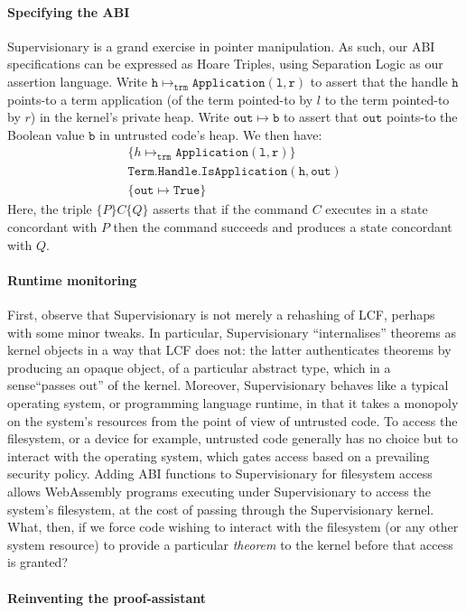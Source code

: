 \documentclass[sigplan, review]{acmart}
\begin{document}
\paragraph{Specifying the ABI}
Supervisionary is a grand exercise in pointer manipulation.
As such, our ABI specifications can be expressed as Hoare Triples, using Separation Logic as our assertion language.
Write $\mathtt{h} \mapsto_{\mathtt{trm}} \mathtt{Application(l, r)}$ to assert that the handle $\mathtt{h}$ points-to a term application (of the term pointed-to by $l$ to the term pointed-to by $r$) in the kernel's private heap.
Write $\mathtt{out} \mapsto \mathtt{b}$ to assert that $\mathtt{out}$ points-to the Boolean value $\mathtt{b}$ in untrusted code's heap.
We then have:
\begin{gather*}
\{ h \mapsto_{\mathtt{trm}} \mathtt{Application(l, r)} \} \\
\mathtt{Term.Handle.IsApplication(h, out)} \\
\{ \mathtt{out} \mapsto \mathtt{True} \}
\end{gather*}
Here, the triple $\{ P \} C \{ Q \}$ asserts that if the command $C$ executes in a state concordant with $P$ then the command succeeds and produces a state concordant with $Q$.

\paragraph{Runtime monitoring}

First, observe that Supervisionary is not merely a rehashing of LCF, perhaps with some minor tweaks.
In particular, Supervisionary ``internalises'' theorems as kernel objects in a way that LCF does not: the latter authenticates theorems by producing an opaque object, of a particular abstract type, which in a sense``passes out'' of the kernel.
Moreover, Supervisionary behaves like a typical operating system, or programming language runtime, in that it takes a monopoly on the system's resources from the point of view of untrusted code.
To access the filesystem, or a device for example, untrusted code generally has no choice but to interact with the operating system, which gates access based on a prevailing security policy. 
Adding ABI functions to Supervisionary for filesystem access allows WebAssembly programs executing under Supervisionary to access the system's filesystem, at the cost of passing through the Supervisionary kernel.
What, then, if we force code wishing to interact with the filesystem (or any other system resource) to provide a particular \emph{theorem} to the kernel before that access is granted?

\paragraph{Reinventing the proof-assistant}
\end{document}
